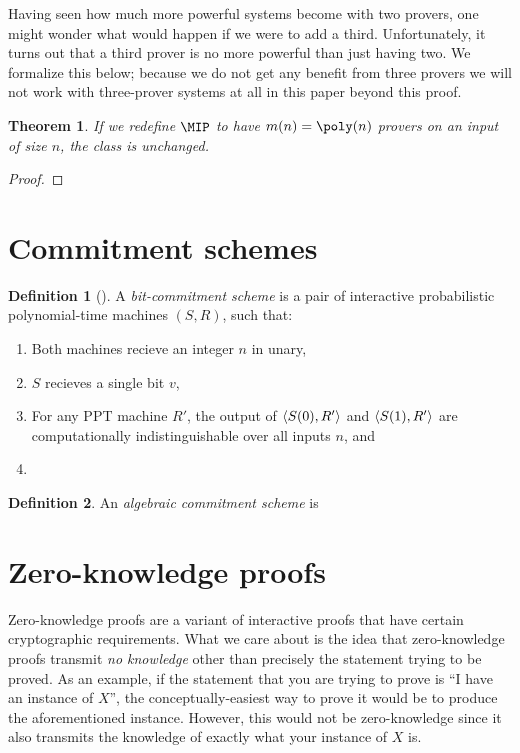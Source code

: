 \documentclass[english]{reedthesis}
\theoremstyle{plain}
\newtheorem{thm}{Theorem}[section]
\theoremstyle{definition}
\newtheorem{defn}[defn]{Definition}
\theoremstyle{remark}
\DeclarePairedDelimiter{\ang}{\langle}{\rangle}
\begin{document}
Having seen how much more powerful systems become with two provers, one might
wonder what would happen if we were to add a third. Unfortunately, it turns out
that a third prover is no more powerful than just having two. We formalize this
below; because we do not get any benefit from three provers we will not work
with three-prover systems at all in this paper beyond this proof.

\begin{thm}\label{thm:mip-unchanged}
  If we redefine $\MIP$ to have $m(n) = \poly(n)$ provers on an input of size
  $n$, the class is unchanged.
\end{thm}

\begin{proof}
\end{proof}

\section{Commitment schemes}

\begin{defn}[{\cite[Def.\ 4.4.1]{Go01}}]\label{def:commitment-scheme}
  A \emph{bit-commitment scheme} is a pair of interactive probabilistic
  polynomial-time machines $(S, R)$, such that:
  \begin{enumerate}
    \item Both machines recieve an integer $n$ in unary,
    \item $S$ recieves a single bit $v$,
    \item For any PPT machine $R'$, the output of $\ang{S(0), R'}$ and
          $\ang{S(1), R'}$ are computationally indistinguishable over all inputs
          $n$, and
    \item %
  \end{enumerate}
\end{defn}

\begin{defn}\label{def:alg-comm-scheme}
  An \emph{algebraic commitment scheme} is %
\end{defn}

\section{Zero-knowledge proofs}\label{sec:zero-knowledge}

Zero-knowledge proofs are a variant of interactive proofs that have certain
cryptographic requirements. What we care about is the idea that zero-knowledge
proofs transmit \emph{no knowledge} other than precisely the statement trying to
be proved. As an example, if the statement that you are trying to prove is ``I
have an instance of $X$'', the conceptually-easiest way to prove it would be to
produce the aforementioned instance. However, this would not be zero-knowledge
since it also transmits the knowledge of exactly what your instance of $X$ is.
\end{document}
